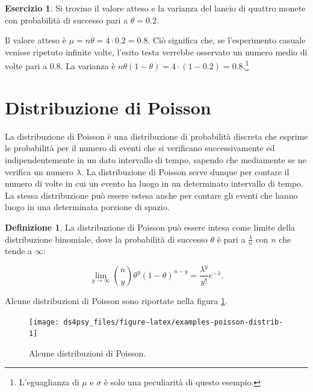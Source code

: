 \documentclass[
  11pt,
]{krantz}
\theoremstyle{definition}
\newtheorem{definition}{Definizione}[chapter]
\theoremstyle{definition}
\theoremstyle{definition}
\newtheorem{exercise}{Esercizio}[chapter]
\theoremstyle{definition}
\theoremstyle{remark}
\begin{document}
\begin{exercise}
Si trovino il valore atteso e la varianza del lancio di quattro monete con probabilità di successo pari a \(\theta = 0.2\).

Il valore atteso è \(\mu = n\theta = 4 \cdot 0.2 = 0.8.\) Ciò significa che, se l'esperimento casuale venisse ripetuto infinite volte, l'esito testa verrebbe osservato un numero medio di volte pari a 0.8. La varianza è \(n \theta (1-\theta) = 4 \cdot(1 - 0.2) = 0.8\).\footnote{L'eguaglianza di \(\mu\) e \(\sigma\) è solo una peculiarità di questo esempio.}
\end{exercise}

\hypertarget{distribuzione-di-poisson}{%
\section{Distribuzione di Poisson}\label{distribuzione-di-poisson}}

La distribuzione di Poisson è una distribuzione di probabilità discreta che esprime le probabilità per il numero di eventi che si verificano successivamente ed indipendentemente in un dato intervallo di tempo, sapendo che mediamente se ne verifica un numero \(\lambda\). La distribuzione di Poisson serve dunque per contare il numero di volte in cui un evento ha luogo in un determinato intervallo di tempo. La stessa distribuzione può essere estesa anche per contare gli eventi che hanno luogo in una determinata porzione di spazio.

\begin{definition}
La distribuzione di Poisson può essere intesa come limite della distribuzione binomiale, dove la probabilità di successo \(\theta\) è pari a \(\frac{\lambda}{n}\) con \(n\) che tende a \(\infty\):

\begin{equation}
\lim_{y \rightarrow \infty} \binom{n}{y} \theta^y (1-\theta)^{n-y} = \frac{\lambda^y}{y!}e^{-\lambda}.
\end{equation}
\end{definition}

Alcune distribuzioni di Poisson sono riportate nella figura \ref{fig:examples-poisson-distrib}.

\begin{figure}[h]

{\centering \texttt{[image: ds4psy\_files/figure-latex/examples-poisson-distrib-1]} 

}

\caption{Alcune distribuzioni di Poisson.}\label{fig:examples-poisson-distrib}
\end{figure}
\end{document}
